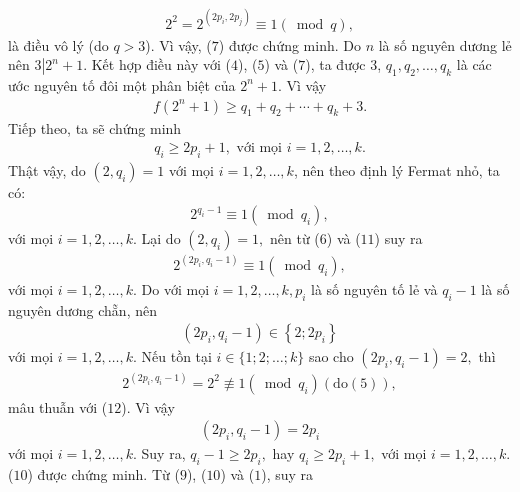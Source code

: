 \begin{multicols}{2}
\begin{align*}
		{2^2} = {2^{\left( {2{p_i},2{p_j}} \right)}} \equiv 1\left( {\bmod q} \right),
	\end{align*}
	là điều vô lý (do $q > 3$). Vì vậy, ($7$) được chứng minh.
	\vskip 0.05cm
	Do $n$ là số nguyên dương lẻ nên $3\left| {{2^n} + 1} \right..$ Kết hợp điều này với ($4$), ($5$) và ($7$), ta được $3$, ${q_1},{q_2}, \ldots ,{q_k}$ là các ước nguyên tố đôi một phân biệt của  $2^n + 1$. Vì vậy
	\begin{align*}
		f\left( {{2^n} + 1} \right) \ge {q_1} + {q_2} +  \cdots  + {q_k} + 3. \tag{$9$}
	\end{align*}
	Tiếp theo, ta sẽ chứng minh
	\begin{align*}
		{q_i} \ge 2{p_i} + 1, \text{ với mọi  } i = 1, 2, \ldots, k.\tag{$10$}
	\end{align*}                                   
	Thật vậy, do $\left( {2,{q_i}} \right) = 1$  với mọi $i = 1, 2, \ldots, k$, nên theo định lý Fermat nhỏ, ta có:
	\begin{align*}
		{2^{{q_i} - 1}} \equiv 1\left( {\bmod {q_i}} \right), \tag{$11$}
	\end{align*}
	với mọi $i = 1, 2, \ldots, k$.
	\vskip 0.05cm
	Lại do  $\left( {2,{q_i}} \right) = 1,$ nên từ ($6$) và ($11$) suy ra
	\begin{align*}
		{2^{\left( {2{p_i},{q_i} - 1} \right)}} \equiv 1\left( {\bmod {q_i}} \right), \tag{$12$}
	\end{align*}
	với mọi $i = 1, 2, \ldots, k$.
	\vskip 0.05cm
	Do với mọi $i = 1, 2, \ldots, k, p_i$  là số nguyên tố lẻ và $q_i -1$  là số nguyên dương chẵn, nên
	\begin{align*}
		\left( {2{p_i},{q_i} - 1} \right) \in \left\{ {2;2{p_i}} \right\}
	\end{align*}
	với mọi $i = 1, 2, \ldots, k$.
	\vskip 0.05cm
	Nếu tồn tại $i \in \{1; 2; \ldots; k\}$ sao cho $\left( {2{p_i},{q_i} - 1} \right) = 2,$  thì
	\begin{align*}
		{2^{\left( {2{p_i},{q_i} - 1} \right)}} = {2^2}\not  \equiv 1\left( {\bmod {q_i}} \right)\left( {{\text{do}}\left( 5 \right)} \right),	
	\end{align*}
	mâu thuẫn với ($12$). Vì vậy
	\begin{align*}
		\left( {2{p_i},{q_i} - 1} \right) = 2{p_i}
	\end{align*}
	với mọi $i = 1, 2, \ldots, k$.
	\vskip 0.05cm
	Suy ra, ${q_i} - 1 \ge 2{p_i},$  hay ${q_i} \ge 2{p_i} + 1,$  với mọi $i = 1, 2, \ldots, k$.
	\vskip 0.05cm
	($10$) được chứng minh.
	\vskip 0.05cm
	Từ ($9$), ($10$) và ($1$), suy ra

\end{multicols}
